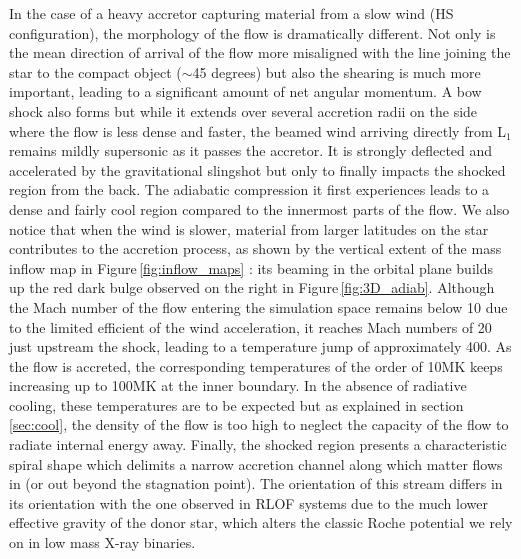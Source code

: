\documentclass{aa}
\makeatletter
\newcommand*{\rlof}{RLOF\@\xspace}
\makeatother
\begin{document}
In the case of a heavy accretor capturing material from a slow wind (HS configuration), the morphology of the flow is dramatically different. Not only is the mean direction of arrival of the flow more misaligned with the line joining the star to the compact object ($\sim$45 degrees) but also the shearing is much more important, leading to a significant amount of net angular momentum. A bow shock also forms but while it extends over several accretion radii on the side where the flow is less dense and faster, the beamed wind arriving directly from L$_1$ remains mildly supersonic as it passes the accretor. It is strongly deflected and accelerated by the gravitational slingshot but only to finally impacts the shocked region from the back. The adiabatic compression it first experiences leads to a dense and fairly cool region compared to the innermost parts of the flow. We also notice that when the wind is slower, material from larger latitudes on the star contributes to the accretion process, as shown by the vertical extent of the mass inflow map in Figure\,\ref{fig:inflow_maps} : its beaming in the orbital plane builds up the red dark bulge observed on the right in Figure\,\ref{fig:3D_adiab}. Although the Mach number of the flow entering the simulation space remains below 10 due to the limited efficient of the wind acceleration, it reaches Mach numbers of 20 just upstream the shock, leading to a temperature jump of approximately 400. As the flow is accreted, the corresponding temperatures of the order of 10MK keeps increasing up to 100MK at the inner boundary. In the absence of radiative cooling, these temperatures are to be expected but as explained in section\,\ref{sec:cool}, the density of the flow is too high to neglect the capacity of the flow to radiate internal energy away. Finally, the shocked region presents a characteristic spiral shape which delimits a narrow accretion channel along which matter flows in (or out beyond the stagnation point). The orientation of this stream differs in its orientation with the one observed in \rlof systems due to the much lower effective gravity of the donor star, which alters the classic Roche potential we rely on in low mass X-ray binaries.
\end{document}
